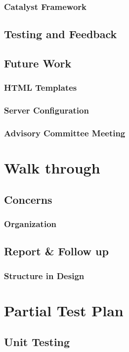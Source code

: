 \documentclass[11pt,a4paper]{report}
\begin{document}
\subsection{ Catalyst Framework }

\section{Testing and Feedback}

\section{Future Work}
\subsection{HTML Templates}
\subsection{Server Configuration}
\subsection{Advisory Committee Meeting}
\chapter{Walk through}
\section{Concerns}
\subsection{Organization}

\section{Report \& Follow up}
\subsection{Structure in Design}

\chapter{Partial Test Plan}
\section{Unit Testing}
\end{document}
